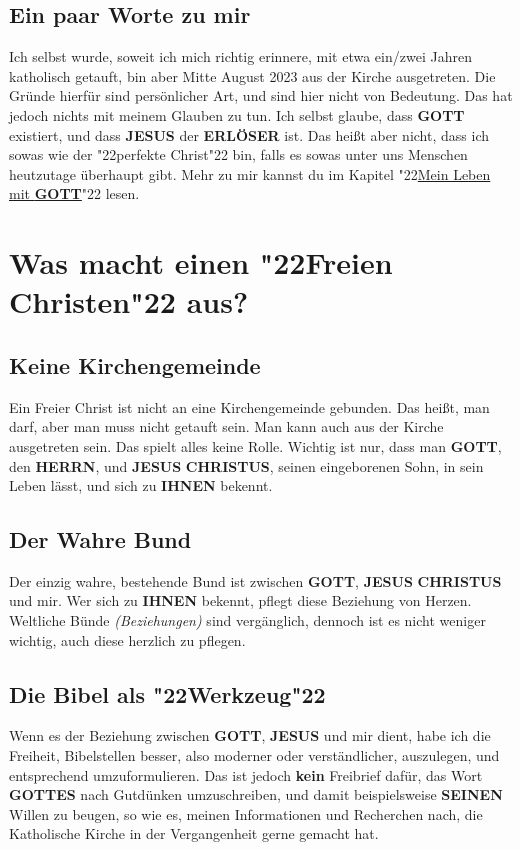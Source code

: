 \documentclass[12pt,a4paper]{article}
\newcommand{\Christus}[0]{\textbf{CHRISTUS}}
\newcommand{\Erloeser}[0]{\textbf{ERL\"OSER}}
\newcommand{\Gottes}[0]{\textbf{GOTTES}}
\newcommand{\Gott}[0]{\textbf{GOTT}}
\newcommand{\Herrn}[0]{\textbf{HERRN}}
\newcommand{\Ihnen}[0]{\textbf{IHNEN}}
\newcommand{\Jesus}[0]{\textbf{JESUS}}
\newcommand{\Seinen}[0]{\textbf{SEINEN}}
\newcommand{\q}[1]{\char"22{#1}\char"22 }
\begin{document}
	\subsection{Ein paar Worte zu mir}
		Ich selbst wurde,
		soweit ich mich richtig erinnere,
		mit etwa ein/zwei Jahren katholisch getauft,
		bin aber Mitte August 2023 aus der Kirche ausgetreten.
		Die Gr\"unde hierf\"ur sind pers\"onlicher Art,
		und sind hier nicht von Bedeutung.
		Das hat jedoch nichts mit meinem Glauben zu tun.
		Ich selbst glaube,
		dass {\Gott} existiert,
		und dass {\Jesus} der {\Erloeser} ist.
		Das hei{\ss}t aber nicht,
		dass ich sowas wie der \q{perfekte Christ} bin,
		falls es sowas unter uns Menschen heutzutage \"uberhaupt gibt.
		Mehr zu mir kannst du im Kapitel \q{\hyperref[MeinLebenMitGott]{Mein Leben mit {\Gott}}} lesen.
	
	\section{Was macht einen \q{Freien Christen} aus?}
	
	\subsection{Keine Kirchengemeinde}
		Ein Freier Christ ist nicht an eine Kirchengemeinde gebunden.
		Das hei{\ss}t,
		man darf,
		aber man muss nicht getauft sein.
		Man kann auch aus der Kirche ausgetreten sein.
		Das spielt alles keine Rolle.
		Wichtig ist nur,
		dass man {\Gott},
		den {\Herrn},
		und {\Jesus} {\Christus},
		seinen eingeborenen Sohn,
		in sein Leben l\"asst,
		und sich zu {\Ihnen} bekennt.
	
	\subsection{Der Wahre Bund}
		Der einzig wahre,
		bestehende Bund ist zwischen {\Gott},
		{\Jesus} {\Christus} und mir.
		Wer sich zu {\Ihnen} bekennt,
		pflegt diese Beziehung von Herzen.
		Weltliche B\"unde \textit{(Beziehungen)} sind verg\"anglich,
		dennoch ist es nicht weniger wichtig,
		auch diese herzlich zu pflegen.
	
	\subsection{Die Bibel als \q{Werkzeug}}
		Wenn es der Beziehung zwischen {\Gott},
		{\Jesus} und mir dient,
		habe ich die Freiheit,
		Bibelstellen besser, also moderner oder verst\"andlicher, auszulegen,
		und entsprechend umzuformulieren.
		Das ist jedoch \textbf{kein} Freibrief daf\"ur,
		das Wort {\Gottes} nach Gutdünken umzuschreiben,
		und damit beispielsweise {\Seinen} Willen zu beugen,
		so wie es,
		meinen Informationen und Recherchen nach,
		die Katholische Kirche in der Vergangenheit gerne gemacht hat.
		
\end{document}
